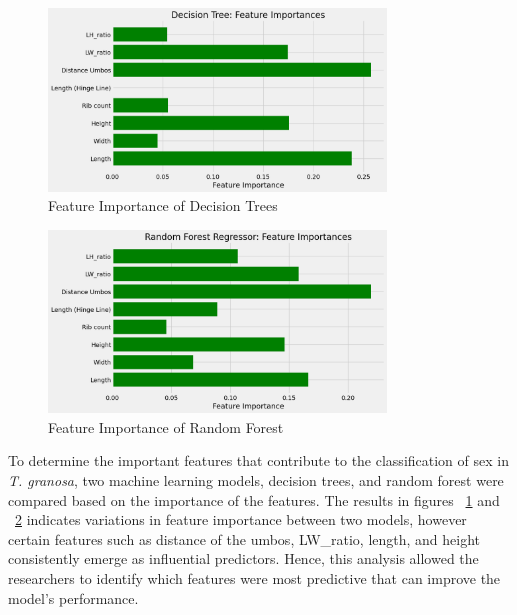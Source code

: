 \begin{figure}[!htbp]
	\centering
	\includegraphics[width=0.8\textwidth]{figures/decision-trees.png}
	\caption{Feature Importance of Decision Trees}
	\label{fig:decision-trees}
\end{figure}

\begin{figure}[!htbp]
	\centering
	\includegraphics[width=0.8\textwidth]{figures/random-forest.png}
	\caption{Feature Importance of Random Forest}
	\label{fig:random-forest}
\end{figure}

To determine the important features that contribute to the classification of sex in \textit{T. granosa}, two machine learning models, decision trees, and random forest were compared based on the importance of the features. The results in figures ~\ref{fig:decision-trees} and ~\ref{fig:random-forest} indicates variations in feature importance between two models, however certain features such as distance of the umbos, LW\_ratio, length, and height consistently emerge as influential predictors. Hence, this analysis allowed the researchers to identify which features were most predictive that can improve the model’s performance. 

